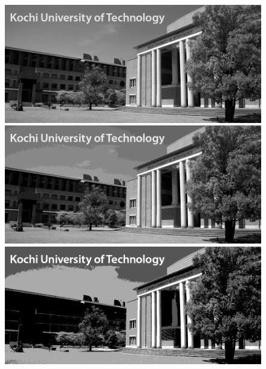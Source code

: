 \begin{figure}[H]
    \centering
    \begin{minipage}[b]{.23\textwidth}
        \centering
        \includegraphics[keepaspectratio,width=\textwidth]{../../Figures/05_21_gimg.png}
    \end{minipage}
    \begin{minipage}[b]{.23\textwidth}
        \centering
        \includegraphics[keepaspectratio,width=\textwidth]{../../Figures/05_22_4bit.png}
    \end{minipage}
    \begin{minipage}[b]{.23\textwidth}
        \centering
        \includegraphics[keepaspectratio,width=\textwidth]{../../Figures/05_23_2bit.png}

\end{minipage}
\end{figure}
